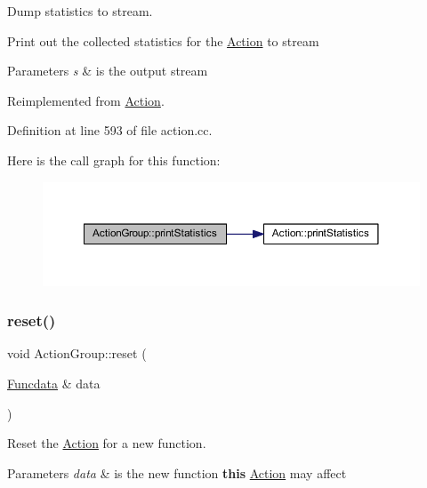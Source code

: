 Dump statistics to stream. 

Print out the collected statistics for the \mbox{\hyperlink{class_action}{Action}} to stream 
\begin{DoxyParams}{Parameters}
{\em s} & is the output stream \\
\hline
\end{DoxyParams}


Reimplemented from \mbox{\hyperlink{class_action_a57e38931fcb3bf9dffac2946d5e790be}{Action}}.



Definition at line 593 of file action.\+cc.

Here is the call graph for this function\+:
\nopagebreak
\begin{figure}[H]
\begin{center}
\leavevmode
\includegraphics[width=350pt]{class_action_group_ac61fd44348c6eabee0ebba16dfc4ff3b_cgraph}
\end{center}
\end{figure}
\mbox{\label{class_action_group_ae5f0c78e136f9bb5b9bcd6256b8ad097}} 
\subsubsection{\texorpdfstring{reset()}{reset()}}
{\footnotesize\ttfamily void Action\+Group\+::reset (\begin{DoxyParamCaption}\item[{\mbox{\hyperlink{class_funcdata}{Funcdata}} \&}]{data }\end{DoxyParamCaption})\hspace{0.3cm}{\ttfamily [virtual]}}



Reset the \mbox{\hyperlink{class_action}{Action}} for a new function. 


\begin{DoxyParams}{Parameters}
{\em data} & is the new function {\bfseries{this}} \mbox{\hyperlink{class_action}{Action}} may affect \\
\hline
\end{DoxyParams}


